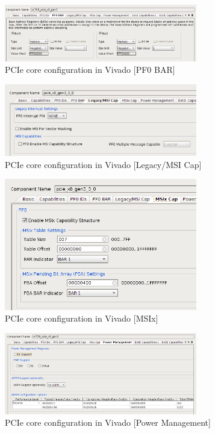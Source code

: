 \newpage

\begin{figure}[H]
\centering
\includegraphics[width=0.75\textwidth]{figures/pcie_core_pf0_bar.png}
\caption{PCIe core configuration in Vivado [PF0 BAR]}
\label{fig:pcie_core_config4}
\end{figure}

\begin{figure}[H]
\centering
\includegraphics[width=0.75\textwidth]{figures/pcie_core_config5.pdf}
\caption{PCIe core configuration in Vivado [Legacy/MSI Cap]}
\label{fig:pcie_core_config5}
\end{figure}

\begin{figure}[H]
\centering
\includegraphics[width=0.75\textwidth]{figures/pcie_core_msix.png}
\caption{PCIe core configuration in Vivado [MSIx]}
\label{fig:pcie_core_config6}
\end{figure}

\newpage

\begin{figure}[H]
\centering
\includegraphics[width=0.75\textwidth]{figures/pcie_core_pwr.png}
\caption{PCIe core configuration in Vivado [Power Management]}
\label{fig:pcie_core_config7}
\end{figure}

